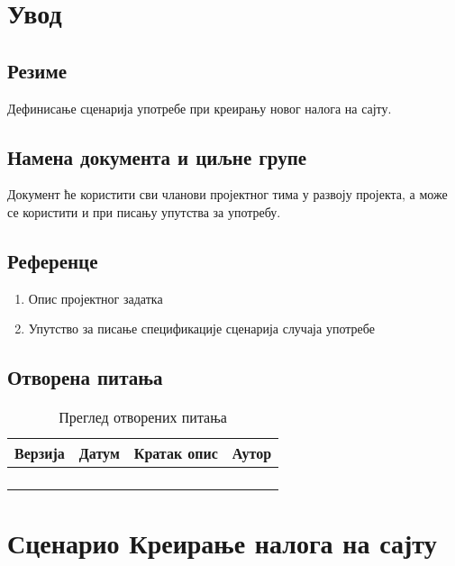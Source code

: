 \section{Увод}

\subsection{Резиме}
Дефинисање сценарија употребе при креирању новог налога на сајту.

\subsection{Намена документа и циљне групе}
Документ ће користити сви чланови пројектног тима у развоју пројекта, а може се 
користити и при писању упутства за употребу.

\subsection{Референце}
\begin{enumerate}
	\item Опис пројектног задатка
	\item Упутство за писање спецификације сценарија случаја употребе
\end{enumerate}

\subsection{Отворена питања}
\begin{table}[h!]
\centering
	
	\begin{tabu}{ || X[l] | X[l] | X[l] | X[l] || }
	\hline
	\textbf{Верзија} & \textbf{Датум} & \textbf{Кратак опис} & \textbf{Аутор} \\
	\hline
	\hline
	& & &\\
	\hline
	& & &\\
	\hline
	& & &\\
	\hline
	& & &\\
	\hline
	\end{tabu}
	\caption{Преглед отворених питања}
	\label{table:2}
		
\end{table}



\section{Сценарио Креирање налога на сајту}

